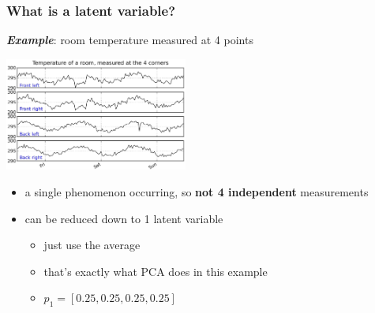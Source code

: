 \begin{frame}\frametitle{What is a latent variable?}

	\textbf{\emph{Example}}: room temperature measured at 4 points
	
	\begin{center}
		\includegraphics[width=6cm]{images/room-temperature-plots.jpg}
	\end{center}
	
	\begin{itemize}
		\item	a single phenomenon occurring, so \textbf{not 4 independent}  measurements
		
		\item	can be reduced down to 1 latent variable
		
				\begin{itemize}
					\item	just use the average
					
					\item	that's exactly what PCA does in this example
					
					\item	\( p_1 = [0.25,  0.25, 0.25, 0.25 ] \)
				\end{itemize}
		
	\end{itemize}
	
	

\end{frame}

